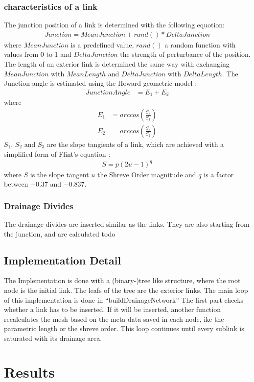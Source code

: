 \documentclass[11pt,a4paper]{article}
\begin{document}
\subsubsection{characteristics of a link}
The junction position of a link is determined with the following equotion:
\begin{align}
Junction = MeanJunction + rand() * DeltaJunction
\end{align} 
where $MeanJunction$ is a predefined value, $rand()$ a random function with
values from 0 to 1 and $DeltaJunction$ the strength of perturbance of the position.
The length of an exterior link is determined the same way with exchanging
$MeanJunction$ with $MeanLength$ and $DeltaJunction$ with $DeltaLength$.
The Junction angle is estimated using the Howard geometric model
\cite{howard1971optimal}:
\begin{align}
JunctionAngle &= E_1 + E_2
\end{align}
where
\begin{align}
E_1 &= arccos(\frac{S_3}{S_1}) \\
E_2 &= arccos(\frac{S_3}{S_2})
\end{align} 
$S_1$, $S_2$ and $S_3$ are the slope tangients of a link, which are achieved
with a simplified form of Flint's equation \cite{flint1974stream}:
\begin{align}
S = p(2u - 1)^q
\end{align}
where $S$ is the slope tangent $u$ the Shreve Order magnitude and $q$ is a
factor between $-0.37$ and $-0.837$.
\subsubsection{Drainage Divides}
The drainage divides are inserted similar as the links. They are also starting 
from the junction, and are calculated 
todo
\subsection{Implementation Detail}
The Implementation is done with a (binary-)tree like structure, where the root
node is the initial link. The leafs of the tree are the exterior links.
The main loop of this implementation is done in ``buildDrainageNetwork''
The first part checks whether a link has to be inserted. If it will be inserted,
another function recalculates the mesh based on the meta data saved in each
node, ike the parametric length or the shreve order.
This loop continues until every sublink is saturated with its drainage area.

\section{Results}


\newpage


\end{document}
